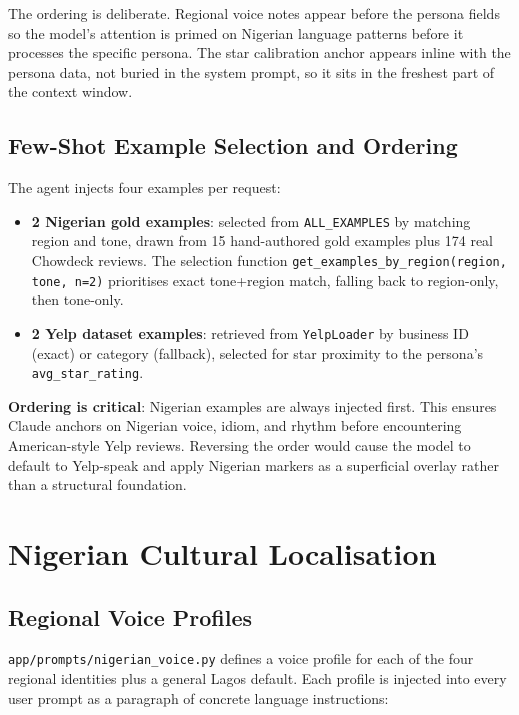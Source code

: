 \documentclass[11pt]{article}
\begin{document}
The ordering is deliberate. Regional voice notes appear before the persona fields so the model's attention is primed on Nigerian language patterns before it processes the specific persona. The star calibration anchor appears inline with the persona data, not buried in the system prompt, so it sits in the freshest part of the context window.

\subsection{Few-Shot Example Selection and Ordering}

The agent injects four examples per request:
\begin{itemize}
    \item \textbf{2 Nigerian gold examples}: selected from \texttt{ALL\_EXAMPLES} by matching region and tone, drawn from 15 hand-authored gold examples plus 174 real Chowdeck reviews. The selection function \texttt{get\_examples\_by\_region(region, tone, n=2)} prioritises exact tone+region match, falling back to region-only, then tone-only.
    \item \textbf{2 Yelp dataset examples}: retrieved from \texttt{YelpLoader} by business ID (exact) or category (fallback), selected for star proximity to the persona's \texttt{avg\_star\_rating}.
\end{itemize}

\textbf{Ordering is critical}: Nigerian examples are always injected first. This ensures Claude anchors on Nigerian voice, idiom, and rhythm before encountering American-style Yelp reviews. Reversing the order would cause the model to default to Yelp-speak and apply Nigerian markers as a superficial overlay rather than a structural foundation.

\section{Nigerian Cultural Localisation}

\subsection{Regional Voice Profiles}

\texttt{app/prompts/nigerian\_voice.py} defines a voice profile for each of the four regional identities plus a general Lagos default. Each profile is injected into every user prompt as a paragraph of concrete language instructions:
\end{document}
